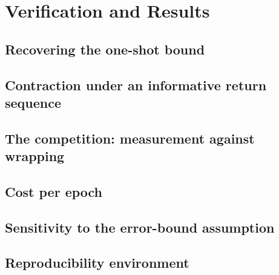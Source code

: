 
\section{Verification and Results}
\label{p2:sec:verification}

\subsection{Recovering the one-shot bound}
\label{p2:sub:recovering_one_shot}

\subsection{Contraction under an informative return sequence}
\label{p2:sub:contraction_demonstration}

\subsection{The competition: measurement against wrapping}
\label{p2:sub:measurement_against_wrapping}

\subsection{Cost per epoch}
\label{p2:sub:cost_per_epoch_results}

\subsection{Sensitivity to the error-bound assumption}
\label{p2:sub:sensitivity_to_error_bounds}

\subsection{Reproducibility environment}
\label{p2:sub:reproducibility}

